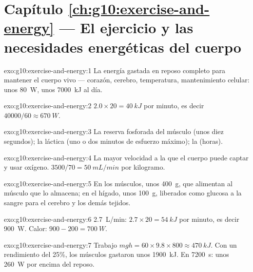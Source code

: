 \section*{Capítulo \ref{ch:g10:exercise-and-energy} --- El ejercicio y las necesidades energéticas del cuerpo}

\begin{solution}{exo:g10:exercise-and-energy:1}
La energía gastada en reposo completo para mantener el cuerpo vivo ---
corazón, cerebro, temperatura, mantenimiento celular: unos \qty{80}{W},
unos \qty{7000}{kJ} al día.
\end{solution}

\begin{solution}{exo:g10:exercise-and-energy:2}
$2.0 \times 20 = \qty{40}{kJ}$ por minuto, es decir $40000/60 \approx
\qty{670}{W}$.
\end{solution}

\begin{solution}{exo:g10:exercise-and-energy:3}
La reserva fosforada del músculo (unos diez segundos); la 
láctica (uno o dos minutos de esfuerzo máximo); la 
(horas).
\end{solution}

\begin{solution}{exo:g10:exercise-and-energy:4}
La mayor velocidad a la que el cuerpo puede captar y usar oxígeno.
$3500/70 = \qty{50}{mL/min}$ por kilogramo.
\end{solution}

\begin{solution}{exo:g10:exercise-and-energy:5}
En los músculos, unos \qty{400}{g}, que alimentan al músculo que lo
almacena; en el hígado, unos \qty{100}{g}, liberados como glucosa a la
sangre para el cerebro y los demás tejidos.
\end{solution}

\begin{solution}{exo:g10:exercise-and-energy:6}
\qty{2.7}{L/min}: $2.7 \times 20 = \qty{54}{kJ}$ por minuto, es decir
\qty{900}{W}. Calor: $900 - 200 = \qty{700}{W}$.
\end{solution}

\begin{solution}{exo:g10:exercise-and-energy:7}
Trabajo $mgh = 60 \times 9.8 \times 800 \approx \qty{470}{kJ}$. Con un
rendimiento del 25\%, los músculos gastaron unos \qty{1900}{kJ}. En
\qty{7200}{s}: unos \qty{260}{W} por encima del reposo.
\end{solution}


